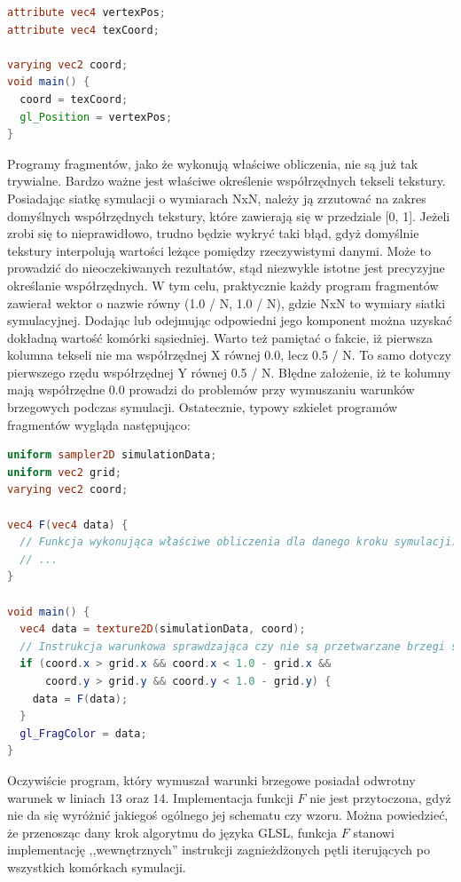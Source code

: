 \begin{lstlisting}[language=GLSL, caption=Typowa implementacja programu
wierzchołków w symulatorze \ow{Energy2D} (język GLSL)]
attribute vec4 vertexPos;
attribute vec4 texCoord;

varying vec2 coord;
void main() {
  coord = texCoord;
  gl_Position = vertexPos;
}
\end{lstlisting}

Programy fragmentów, jako że wykonują właściwe obliczenia, nie są już tak
trywialne. Bardzo ważne jest właściwe określenie współrzędnych tekseli tekstury.
Posiadając siatkę symulacji o wymiarach NxN, należy ją zrzutować na zakres
domyślnych współrzędnych tekstury, które zawierają się w przedziale [0, 1].
Jeżeli zrobi się to nieprawidłowo, trudno będzie wykryć taki błąd, gdyż
domyślnie tekstury interpolują wartości leżące pomiędzy rzeczywistymi danymi.
Może to prowadzić do nieoczekiwanych rezultatów, stąd niezwykle istotne jest
precyzyjne określanie współrzędnych. W tym celu, praktycznie każdy program
fragmentów zawierał wektor o nazwie  równy (1.0 / N, 1.0 / N), gdzie
NxN to wymiary siatki symulacyjnej. Dodając lub odejmując odpowiedni jego
komponent można uzyskać dokładną wartość komórki sąsiedniej. Warto też pamiętać
o fakcie, iż pierwsza kolumna tekseli nie ma współrzędnej X równej 0.0, lecz 0.5
/ N. To samo dotyczy pierwszego rzędu współrzędnej Y równej 0.5 / N. Błędne
założenie, iż te kolumny mają współrzędne 0.0 prowadzi do problemów przy
wymuszaniu warunków brzegowych podczas symulacji. Ostatecznie, typowy szkielet
programów fragmentów wygląda następująco:

\begin{lstlisting}[language=GLSL, caption=Szkielet implementacji programu
fragmentów w symulatorze \ow{Energy2D} (język GLSL)]
uniform sampler2D simulationData;
uniform vec2 grid;
varying vec2 coord;

vec4 F(vec4 data) {
  // Funkcja wykonująca właściwe obliczenia dla danego kroku symulacji.
  // ...
}

void main() {
  vec4 data = texture2D(simulationData, coord);
  // Instrukcja warunkowa sprawdzająca czy nie są przetwarzane brzegi siatki.
  if (coord.x > grid.x && coord.x < 1.0 - grid.x &&
      coord.y > grid.y && coord.y < 1.0 - grid.y) {
    data = F(data);
  }
  gl_FragColor = data;
}
\end{lstlisting}

Oczywiście program, który wymuszał warunki brzegowe posiadał odwrotny warunek
w liniach 13 oraz 14. Implementacja funkcji $F$ nie jest przytoczona, gdyż nie
da się wyróżnić jakiegoś ogólnego jej schematu czy wzoru. Można powiedzieć, że
przenosząc dany krok algorytmu do języka GLSL, funkcja $F$ stanowi
implementację ,,wewnętrznych'' instrukcji zagnieżdżonych pętli iterujących po
wszystkich komórkach symulacji.


